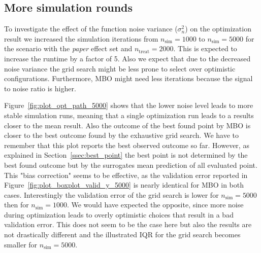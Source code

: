 \documentclass[bimj,fleqn]{w-art}
\theoremstyle{plain}
\theoremstyle{definition}
\begin{document}




\subsection{More simulation rounds}

To investigate the effect of the function noise variance ($\sigma^2_n$) on the optimization result we increased the simulation iterations from $n_\text{sim} = 1000$ to $n_\text{sim} = 5000$ for the scenario with the \emph{paper} effect set and  $n_{\text{treat}} = 2000$.
This is expected to increase the runtime by a factor of 5.
Also we expect that due to the decreased noise variance the grid search might be less prone to select over optimistic configurations.
Furthermore, MBO might need less iterations because the signal to noise ratio is higher.

Figure~\ref{fig:plot_opt_path_5000} shows that the lower noise level leads to more stable simulation runs, meaning that a single optimization run leads to a results closer to the mean result.
Also the outcome of the best found point by MBO is closer to the best outcome found by the exhaustive grid search.
We have to remember that this plot reports the best observed outcome so far. 
However, as explained in Section~\ref{ssec:best_point} the best point is not determined by the best found outcome but by the surrogates mean prediction of all evaluated point.
This "bias correction" seems to be effective, as the validation error reported in Figure~\ref{fig:plot_boxplot_valid_y_5000} is nearly identical for MBO in both cases.
Interestingly the validation error of the grid search is lower for $n_\text{sim} = 5000$ then for $n_\text{sim} = 1000$.
We would have expected the opposite, since more noise during optimization leads to overly optimistic choices that result in a bad validation error.
This does not seem to be the case here but also the results are not drastically different and the illustrated IQR for the grid search becomes smaller for $n_\text{sim} = 5000$.

\end{document}
